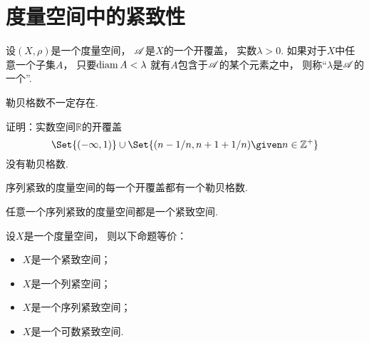 \section{度量空间中的紧致性}
\begin{definition}
设\((X,\rho)\)是一个度量空间，
\(\mathscr{A}\)是\(X\)的一个开覆盖，
实数\(\lambda>0\).
如果对于\(X\)中任意一个子集\(A\)，
	只要\(\operatorname{diam} A < \lambda\)
	就有\(A\)包含于\(\mathscr{A}\)的某个元素之中，
则称“\(\lambda\)是\(\mathscr{A}\)的一个”.
\end{definition}

勒贝格数不一定存在.
\begin{example}
证明：实数空间\(\mathbb{R}\)的开覆盖\begin{equation*}
	\Set{(-\infty,1)}
	\cup
	\Set{
		(n-1/n,n+1+1/n)
		\given
		n\in\mathbb{Z}^+
	}
\end{equation*}
没有勒贝格数.
\end{example}

\begin{theorem}
序列紧致的度量空间的每一个开覆盖都有一个勒贝格数.
\end{theorem}

\begin{theorem}
任意一个序列紧致的度量空间都是一个紧致空间.
\end{theorem}

\begin{theorem}
设\(X\)是一个度量空间，
则以下命题等价：\begin{itemize}
	\item \(X\)是一个紧致空间；
	\item \(X\)是一个列紧空间；
	\item \(X\)是一个序列紧致空间；
	\item \(X\)是一个可数紧致空间.
\end{itemize}
\end{theorem}
